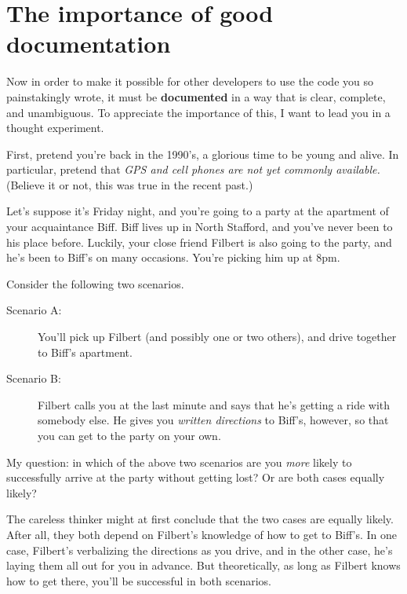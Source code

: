 \section{The importance of good documentation}

Now in order to make it possible for other developers to use the code you so
painstakingly wrote, it must be \textbf{documented} in a way that is clear,
complete, and unambiguous. To appreciate the importance of this, I want to
lead you in a thought experiment.

First, pretend you're back in the 1990's, a glorious time to be young and
alive. In particular, pretend that \textit{GPS and cell phones are not yet
commonly available.} (Believe it or not, this was true in the recent past.)

Let's suppose it's Friday night, and you're going to a party at the apartment
of your acquaintance Biff. Biff lives up in North Stafford, and you've never
been to his place before. Luckily, your close friend Filbert is also going to
the party, and he's been to Biff's on many occasions. You're picking him up at
8pm.

Consider the following two scenarios.

\begin{description}

\item[Scenario A:] You'll pick up Filbert (and possibly one or two others), and
drive together to Biff's apartment.

\item[Scenario B:] Filbert calls you at the last minute and says that he's
getting a ride with somebody else. He gives you \textit{written directions} to
Biff's, however, so that you can get to the party on your own.

\end{description}

My question: in which of the above two scenarios are you \textit{more} likely
to successfully arrive at the party without getting lost? Or are both cases
equally likely?

The careless thinker might at first conclude that the two cases are equally
likely. After all, they both depend on Filbert's knowledge of how to get to
Biff's. In one case, Filbert's verbalizing the directions as you drive, and in
the other case, he's laying them all out for you in advance. But
theoretically, as long as Filbert knows how to get there, you'll be successful
in both scenarios.

